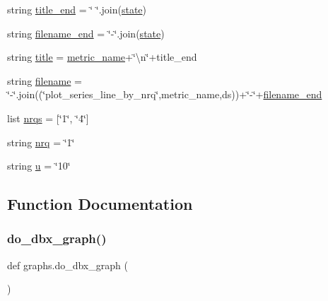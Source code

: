 \begin{DoxyCompactItemize}
\item 
string \hyperlink{namespacegraphs_aa540bee28bd06e5b052021cfee6675c7}{title\+\_\+end} = \char`\"{} \char`\"{}.join(\hyperlink{namespacegraphs_a7e28b4b5f2a57b0c7edebb674233cf1e}{state})
\item 
string \hyperlink{namespacegraphs_aa9dc708029dd1052d8aa26ecfdb9c898}{filename\+\_\+end} = \char`\"{}-\/\char`\"{}.join(\hyperlink{namespacegraphs_a7e28b4b5f2a57b0c7edebb674233cf1e}{state})
\item 
string \hyperlink{namespacegraphs_a64551207fb3a71a0f3c293a3539f14e6}{title} = \hyperlink{namespacegraphs_a0c8becd7cf726f44e9c148109fcf06af}{metric\+\_\+name}+\char`\"{}\textbackslash{}n\char`\"{}+title\+\_\+end
\item 
string \hyperlink{namespacegraphs_add61a1e3eb0503ac58c89959c4ab20be}{filename} = \char`\"{}-\/\char`\"{}.join((\char`\"{}plot\+\_\+series\+\_\+line\+\_\+by\+\_\+nrq\char`\"{},metric\+\_\+name,ds))+\char`\"{}-\/\char`\"{}+\hyperlink{namespacegraphs_aa9dc708029dd1052d8aa26ecfdb9c898}{filename\+\_\+end}
\item 
list \hyperlink{namespacegraphs_a0ff758a5227083ab33bb0126320ad3ad}{nrqs} = \mbox{[}\char`\"{}1\char`\"{}, \char`\"{}4\char`\"{}\mbox{]}
\item 
string \hyperlink{namespacegraphs_a10b80a7ad5998da881d1beb0ce1e1604}{nrq} = \char`\"{}1\char`\"{}
\item 
string \hyperlink{namespacegraphs_aebc3e1c4f83749bafa0b9caba4731c50}{u} = \char`\"{}10\char`\"{}
\end{DoxyCompactItemize}


\subsection{Function Documentation}
\mbox{\label{namespacegraphs_a2763f70f297c96908aa5a0a1c5807da4}} 
\subsubsection{\texorpdfstring{do\+\_\+dbx\+\_\+graph()}{do\_dbx\_graph()}}
{\footnotesize\ttfamily def graphs.\+do\+\_\+dbx\+\_\+graph (\begin{DoxyParamCaption}{ }\end{DoxyParamCaption})}

\mbox{\label{namespacegraphs_a01540d61a6e4b033deadaa69f64ea1fd}} 
